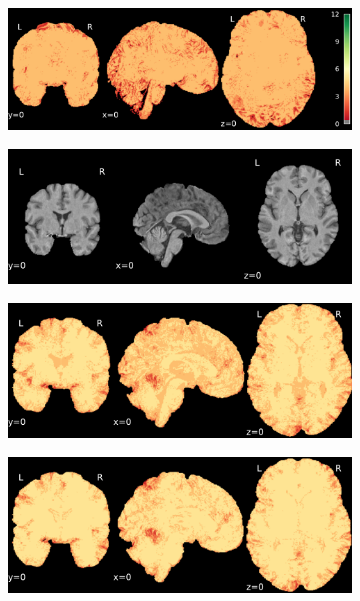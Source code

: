 \documentclass{article}
\begin{document}
\begin{landscape}
\begin{figure}
\begin{subfigure}[t]{0.2\paperheight}
        \end{subfigure}
        \begin{subfigure}[t]{0.2\paperheight}
            \centering
            \includegraphics[width=\textwidth]{figures/sig/ds002338_sub-xp201_rr.rs_sig.pdf}
        \end{subfigure}
        \begin{subfigure}[t]{0.2\paperheight}
            \centering
            \includegraphics[width=\textwidth]{figures/ieee_T1/ds002338_sub-xp207_ieee_mean.pdf}
        \end{subfigure}
        \begin{subfigure}[t]{0.2\paperheight}
            \centering
            \includegraphics[width=\textwidth]{figures/sig/ds002338_sub-xp207_rr_sig.pdf}
        \end{subfigure}
        \begin{subfigure}[t]{0.2\paperheight}
            \centering
            \includegraphics[width=\textwidth]{figures/sig/ds002338_sub-xp207_rs_sig.pdf}

\end{subfigure}
\end{figure}
\end{landscape}
\end{document}
